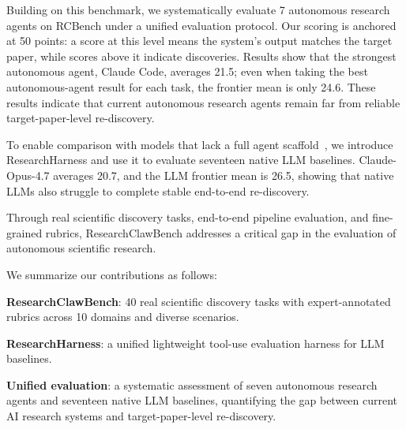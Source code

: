 Building on this benchmark, we systematically evaluate 7 autonomous research agents on RCBench under a unified evaluation protocol. Our scoring is anchored at 50 points: a score at this level means the system's output matches the target paper, while scores above it indicate discoveries. Results show that the strongest autonomous agent, Claude Code, averages 21.5; even when taking the best autonomous-agent result for each task, the frontier mean is only 24.6. These results indicate that current autonomous research agents remain far from reliable target-paper-level re-discovery.

To enable comparison with models that lack a full agent scaffold~\citep{liu2025agent}, we introduce ResearchHarness and use it to evaluate seventeen native LLM baselines.
Claude-Opus-4.7 averages 20.7, and the LLM frontier mean is 26.5, showing that native LLMs also struggle to complete stable end-to-end re-discovery.

Through real scientific discovery tasks, end-to-end pipeline evaluation, and fine-grained rubrics, ResearchClawBench addresses a critical gap in the evaluation of autonomous scientific research.

We summarize our contributions as follows:

\begin{compactitem}
\item \textbf{ResearchClawBench}: 40 real scientific discovery tasks with expert-annotated rubrics across 10 domains and diverse scenarios.
\item \textbf{ResearchHarness}: a unified lightweight tool-use evaluation harness for LLM baselines.
\item \textbf{Unified evaluation}: a systematic assessment of seven autonomous research agents and seventeen native LLM baselines, quantifying the gap between current AI research systems and target-paper-level re-discovery.
\end{compactitem}
